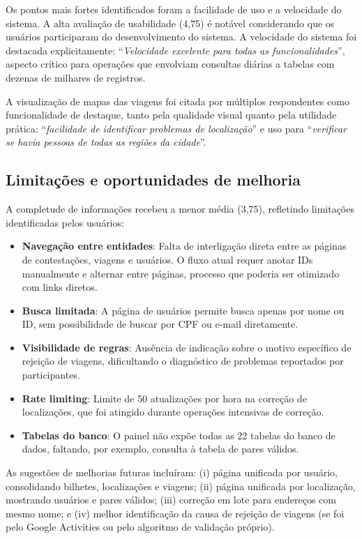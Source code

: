 Os pontos mais fortes identificados foram a facilidade de uso e a velocidade do sistema. A alta avaliação de usabilidade (4,75) é notável considerando que os usuários participaram do desenvolvimento do sistema. A velocidade do sistema foi destacada explicitamente: ``\textit{Velocidade excelente para todas as funcionalidades}'', aspecto crítico para operações que envolviam consultas diárias a tabelas com dezenas de milhares de registros.

A visualização de mapas das viagens foi citada por múltiplos respondentes como funcionalidade de destaque, tanto pela qualidade visual quanto pela utilidade prática: ``\textit{facilidade de identificar problemas de localização}'' e uso para ``\textit{verificar se havia pessoas de todas as regiões da cidade}''.

\subsection{Limitações e oportunidades de melhoria}

A completude de informações recebeu a menor média (3,75), refletindo limitações identificadas pelos usuários:

\begin{itemize}
  \item \textbf{Navegação entre entidades}: Falta de interligação direta entre as páginas de contestações, viagens e usuários. O fluxo atual requer anotar IDs manualmente e alternar entre páginas, processo que poderia ser otimizado com links diretos.
  \item \textbf{Busca limitada}: A página de usuários permite busca apenas por nome ou ID, sem possibilidade de buscar por CPF ou e-mail diretamente.
  \item \textbf{Visibilidade de regras}: Ausência de indicação sobre o motivo específico de rejeição de viagens, dificultando o diagnóstico de problemas reportados por participantes.
  \item \textbf{Rate limiting}: Limite de 50 atualizações por hora na correção de localizações, que foi atingido durante operações intensivas de correção.
  \item \textbf{Tabelas do banco}: O painel não expõe todas as 22 tabelas do banco de dados, faltando, por exemplo, consulta à tabela de pares válidos.
\end{itemize}

As sugestões de melhorias futuras incluíram: (i) página unificada por usuário, consolidando bilhetes, localizações e viagens; (ii) página unificada por localização, mostrando usuários e pares válidos; (iii) correção em lote para endereços com mesmo nome; e (iv) melhor identificação da causa de rejeição de viagens (se foi pelo Google Activities ou pelo algoritmo de validação próprio).

